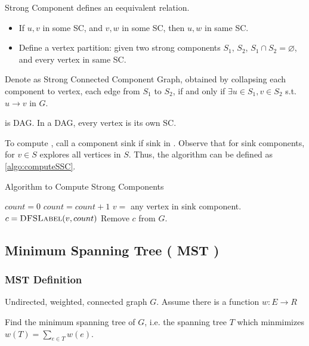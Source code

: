 Strong Component defines an eequivalent relation.
\begin{itemize}
    \item If $u,v$ in some SC, and $v,w$ in some SC, then
        $u,w$ in same SC.
    \item Define a vertex partition: given two strong components
        $S_1$, $S_2$, $S_1 \cap S_2 = \varnothing$,
        and every vertex in same SC.
\end{itemize}

Denote  as Strong Connected Component Graph,
obtained by collapsing each component to vertex, each edge
from $S_1$ to $S_2$, if and only if $\exists u \in S_1, v \in S_2$
s.t. $u \rightarrow v$ in $G$.

 is DAG.
In a DAG, every vertex is its own SC.

To compute , call a component sink if sink in
.
Observe that for sink components,  for $v \in S$
explores all vertices in $S$.
Thus, the algorithm can be defined as \cref{algo:computeSSC}.

\begin{algorithm}[H]
    \caption{Algorithm to Compute Strong Components}\label{algo:computeSSC}
    \begin{algorithmic}[1]
            \State $count = 0$
                \State $count = count + 1$
                \State $v = $ any vertex in sink component.
                \State $c = \textsc{DFSLabel} (v,count)$
                \State Remove $c$ from $G$.
            \EndWhile
        \EndProcedure
    \end{algorithmic}
\end{algorithm}

\subsection{Minimum Spanning Tree ( MST )}

\subsubsection{MST Definition}
\AlgoInput Undirected, weighted, connected graph $G$.
Assume there is a function $w:E \rightarrow R$

\AlgoOutput Find the minimum spanning tree of $G$,
i.e. the spanning tree $T$ which minmimizes
$\displaystyle w(T) = \sum_{e \in T} w(e)$.

